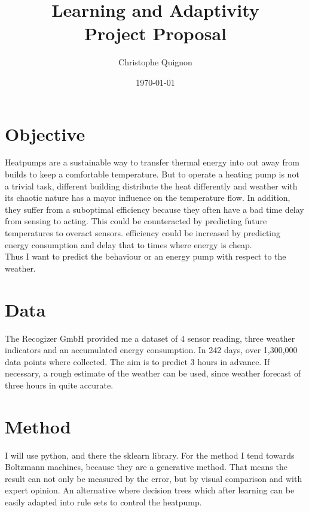 \documentclass[	DIV=calc,%
				paper=a4,%
				fontsize=11pt,%
				twocolumn]{scrartcl}	 %
\title{Learning and Adaptivity
\\ Project Proposal}%
\author{Christophe Quignon }	%
\date{\today}
\begin{document}
\maketitle
\thispagestyle{fancy} %
\section{Objective}
Heatpumps are a sustainable way to transfer thermal energy into out away from builds to keep a comfortable temperature. But to operate a heating pump is not a trivial task, different building distribute the heat differently and weather with its chaotic nature has a mayor influence on the temperature flow. In addition, they suffer from a suboptimal efficiency because they often have a bad time delay from sensing to acting. This could be counteracted by predicting future temperatures to overact sensors. efficiency could be increased by predicting energy consumption and delay that to times where energy is cheap.\\
Thus I want to predict the behaviour or an energy pump with respect to the weather.

\section{Data}
The Recogizer GmbH provided me a dataset of 4 sensor reading, three weather indicators and an accumulated energy consumption. In 242 days, over 1,300,000 data points where collected. The aim is to predict 3 hours in advance. If necessary, a rough estimate of the weather can be used, since weather forecast of three hours in quite accurate.


\section{Method}
I will use python, and there the sklearn library.
For the method I tend towards Boltzmann machines, because they are a generative method. That means the result can not only be measured by the error, but by visual comparison and with expert opinion.
An alternative where decision trees which after learning can be easily adapted into rule sets to control the heatpump.
\end{document}
